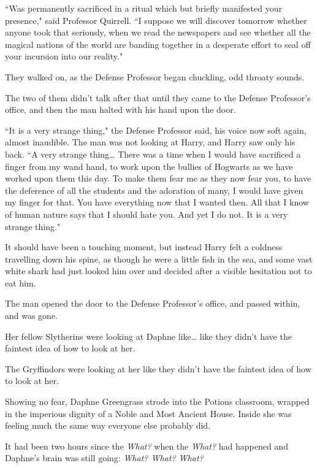 ``Was permanently sacrificed in a ritual which but briefly manifested your presence," said Professor Quirrell. ``I suppose we will discover tomorrow whether anyone took that seriously, when we read the newspapers and see whether all the magical nations of the world are banding together in a desperate effort to seal off your incursion into our reality."

They walked on, as the Defense Professor began chuckling, odd throaty sounds.

The two of them didn't talk after that until they came to the Defense Professor's office, and then the man halted with his hand upon the door.

``It is a very strange thing," the Defense Professor said, his voice now soft again, almost inaudible. The man was not looking at Harry, and Harry saw only his back. ``A very strange thing{\ldots} There was a time when I would have sacrificed a finger from my wand hand, to work upon the bullies of Hogwarts as we have worked upon them this day. To make them fear me as they now fear you, to have the deference of all the students and the adoration of many, I would have given my finger for that. You have everything now that I wanted then. All that I know of human nature says that I should hate you. And yet I do not. It is a very strange thing."

It should have been a touching moment, but instead Harry felt a coldness travelling down his spine, as though he were a little fish in the sea, and some vast white shark had just looked him over and decided after a visible hesitation not to eat him.

The man opened the door to the Defense Professor's office, and passed within, and was gone.


Her fellow Slytherins were looking at Daphne like{\ldots} like they didn't have the faintest idea of how to look at her.

The Gryffindors were looking at her like they didn't have the faintest idea of how to look at her.

Showing no fear, Daphne Greengrass strode into the Potions classroom, wrapped in the imperious dignity of a Noble and Most Ancient House. Inside she was feeling much the same way everyone else probably did.

It had been two hours since the \emph{What?} when the \emph{What?} had happened and Daphne's brain was still going: \emph{What? What? What?}

